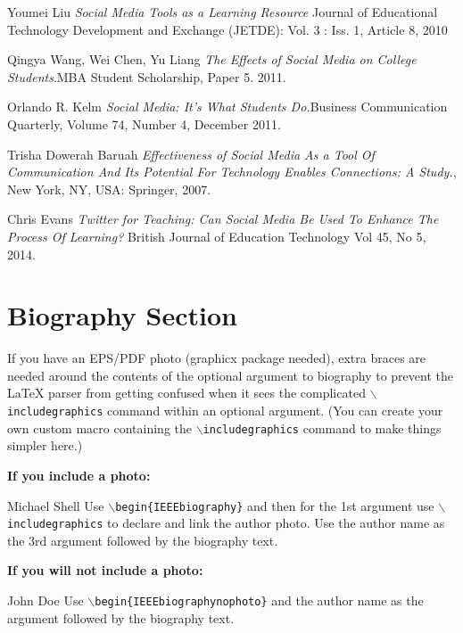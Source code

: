 \documentclass[lettersize,journal]{IEEEtran}
\begin{document}
\begin{thebibliography}{}


	Youmei Liu {\it{Social Media Tools as a Learning Resource}} Journal of Educational Technology Development and Exchange (JETDE): Vol. 3 : Iss. 1, Article 8, 2010

Qingya Wang, Wei Chen, Yu Liang {\it{The Effects of Social Media on College Students}}.MBA Student Scholarship, Paper 5. 2011.

	Orlando R. Kelm {\it{Social Media: It's What Students Do.}}Business Communication Quarterly, Volume 74, Number 4, December 2011.

Trisha Dowerah Baruah {\it{Effectiveness of Social Media As a Tool Of Communication And Its Potential For Technology Enables Connections: A Study.}}, New York, NY, USA: Springer, 2007.

	Chris Evans {\it{Twitter for Teaching: Can Social Media Be Used To Enhance The Process Of Learning?}} British Journal of Education Technology
Vol 45, No 5, 2014.
\end{thebibliography}


\newpage

\section{Biography Section}
If you have an EPS/PDF photo (graphicx package needed), extra braces are
 needed around the contents of the optional argument to biography to prevent
 the LaTeX parser from getting confused when it sees the complicated
 $\backslash${\tt{includegraphics}} command within an optional argument. (You can create
 your own custom macro containing the $\backslash${\tt{includegraphics}} command to make things
 simpler here.)
 
\vspace{11pt}

\bf{If you include a photo:}\vspace{-33pt}
\begin{IEEEbiography}{Michael Shell}
Use $\backslash${\tt{begin\{IEEEbiography\}}} and then for the 1st argument use $\backslash${\tt{includegraphics}} to declare and link the author photo.
Use the author name as the 3rd argument followed by the biography text.
\end{IEEEbiography}

\vspace{11pt}

\bf{If you will not include a photo:}\vspace{-33pt}
\begin{IEEEbiographynophoto}{John Doe}
Use $\backslash${\tt{begin\{IEEEbiographynophoto\}}} and the author name as the argument followed by the biography text.
\end{IEEEbiographynophoto}




\vfill
\end{document}
